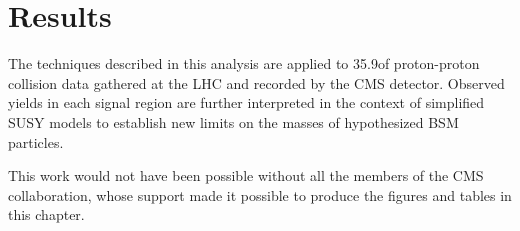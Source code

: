 \chapter{Results}
\label{ch:results}
The techniques described in this analysis are applied to 35.9\fbinv of proton-proton collision data gathered at the LHC and recorded by the CMS detector. Observed yields in each signal region are further interpreted in the context of simplified SUSY models to establish new limits on the masses of hypothesized BSM particles.




This work would not have been possible without all the members of the CMS collaboration, whose support made it possible to produce the figures and tables in this chapter.

